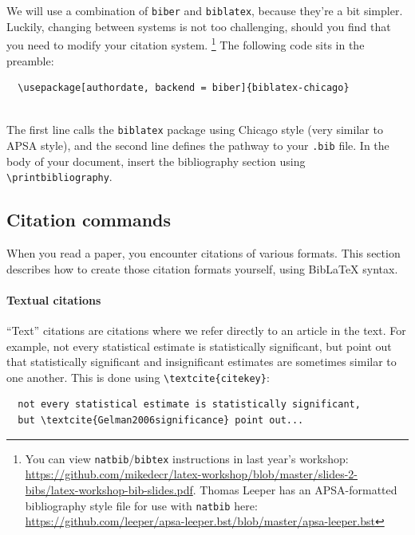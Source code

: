 \documentclass[12pt
              ]{article}
\begin{document}
We will use a combination of \texttt{biber} and \texttt{biblatex}, because they're a bit simpler. Luckily, changing between systems is not too challenging, should you find that you need to modify your citation system.%
  \footnote{You can view \texttt{natbib}/\texttt{bibtex} instructions in last year's workshop: \url{https://github.com/mikedecr/latex-workshop/blob/master/slides-2-bibs/latex-workshop-bib-slides.pdf}. Thomas Leeper has an APSA-formatted bibliography style file for use with \texttt{natbib} here: \url{https://github.com/leeper/apsa-leeper.bst/blob/master/apsa-leeper.bst}}
The following code sits in the preamble:
\newline
\begin{minipage}{\linewidth}
\begin{lstlisting}
  \usepackage[authordate, backend = biber]{biblatex-chicago} 
  
\end{lstlisting}
\end{minipage}
The first line calls the \texttt{biblatex} package using Chicago style (very similar to APSA style), and the second line defines the pathway to your \texttt{.bib} file. In the body of your document, insert the bibliography section using \verb+\printbibliography+.




\subsection{Citation commands}

When you read a paper, you encounter citations of various formats. This section describes how to create those citation formats yourself, using Bib{\LaTeX} syntax.

\paragraph{Textual citations} 
``Text'' citations are citations where we refer directly to an article in the text. For example, not every statistical estimate is statistically significant, but \textcite{Gelman2006significance} point out that statistically significant and insignificant estimates are sometimes similar to one another. This is done using \verb+\textcite{citekey}+: 
\newline
\begin{minipage}{\linewidth}
\begin{lstlisting}
  not every statistical estimate is statistically significant, 
  but \textcite{Gelman2006significance} point out...
\end{lstlisting}
\end{minipage}
\end{document}
